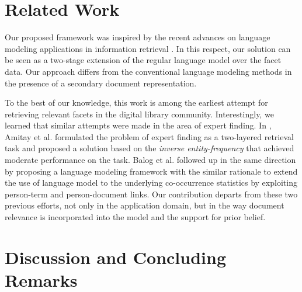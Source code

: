 
\section{Related Work}\label{s:related-work}

Our proposed framework was inspired by the recent advances on language modeling
applications in information retrieval
\cite{lavrenko2001relevance,zhai2001language,zaragorza2003bayesian}.  In this
respect, our solution can be seen as a two-stage extension of the regular
language model over the facet data.  Our approach differs from the conventional
language modeling methods in the presence of a secondary document
representation.  

To the best of our knowledge, this work is among the earliest attempt for
retrieving relevant facets in the digital library community.  Interestingly, we
learned that similar attempts were made in the area of expert finding.  In
\cite{amitay2008finding}, Amitay et al. formulated the problem of expert
finding as a two-layered retrieval task and proposed a solution based on the
\emph{inverse entity-frequency} that achieved moderate performance on the task.
Balog et al. \cite{balog2009language} followed up in the same direction by
proposing a language modeling framework with the similar rationale to extend
the use of language model to the underlying co-occurrence statistics by
exploiting person-term and person-document links.  Our contribution departs
from these two previous efforts, not only in the application domain, but in the
way document relevance is incorporated into the model and the support for prior
belief.  
 
\section{Discussion and Concluding Remarks}\label{s:concluding-remarks}

